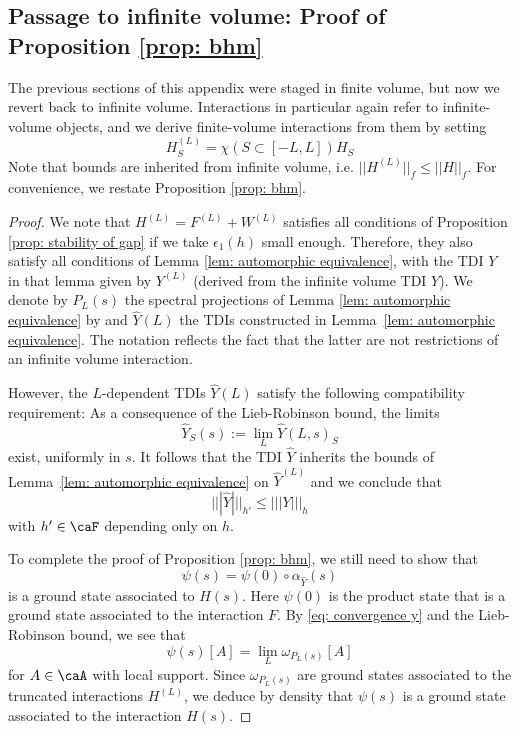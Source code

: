 \subsection{Passage to infinite volume: Proof of Proposition \ref{prop: bhm}} \label{sec: passage and proof}
The previous sections of this appendix were staged in finite volume, but now we revert back to infinite volume. Interactions in particular again refer to infinite-volume objects, and we derive finite-volume interactions from them by setting
$$
H^{(L)}_S=\chi(S \subset [-L,L]) H_S 
$$
Note that bounds are inherited from infinite volume, i.e.
$
||H^{(L)} ||_f \leq   ||H||_f
$. 
For convenience, we restate Proposition \ref{prop: bhm}.
\bhm*
\begin{proof}
	We note that $H^{(L)}=F^{(L)}+W^{(L)}$ satisfies all conditions of Proposition \ref{prop: stability of gap} if we take $\epsilon_1(h)$ small enough. Therefore, they also satisfy all conditions of Lemma \ref{lem: automorphic equivalence}, with the TDI $Y$ in that lemma given by $Y^{(L)}$ (derived from the infinite volume TDI $Y$). We denote by $P_L(s)$ the spectral projections of Lemma \ref{lem: automorphic equivalence} by  and $\hat{Y}(L)$  the TDIs constructed in Lemma~\ref{lem: automorphic equivalence}. The notation reflects the fact that the latter are not restrictions of an infinite volume interaction.  
	
	However, the $L$-dependent TDIs $\hat{Y}(L)$ satisfy the following compatibility requirement: As a consequence of the Lieb-Robinson bound, the limits
	\begin{equation} \label{eq: convergence y}
		\hat{Y}_S(s):= 
		\lim_L \hat{Y}(L,s)_S
	\end{equation}
	exist, uniformly in $s$.  It follows that the TDI $\hat{Y}$ inherits the bounds of Lemma~\ref{lem: automorphic equivalence} on $\hat{Y}^{(L)}$ and we conclude that 
	$$
	|||\hat{Y}|||_{h'}\leq  |||{Y}|||_{h} 
	$$
	with $h'\in\caF$ depending only on $h$. 
	
	To complete the proof of Proposition \ref{prop: bhm}, we still need to show that 
	$$
	\psi(s)=\psi(0)\circ\alpha_{\hat Y}(s) 
	$$
	is a ground state associated to $H(s)$.   Here $\psi(0)$ is the product state that is a ground state associated to the interaction $F$. 
	By \eqref{eq: convergence y} and the Lieb-Robinson bound, we see that 
	$$
	\psi(s)[A] = \lim_L \omega_{P_L(s)}[A]
	$$
	for $A\in \caA$ with local support.  
	Since $\omega_{P_L(s)}$ are ground states associated to the truncated interactions $H^{(L)}$, we deduce by density that  $\psi(s)$ is a ground state associated to the interaction $H(s)$. 
\end{proof}





